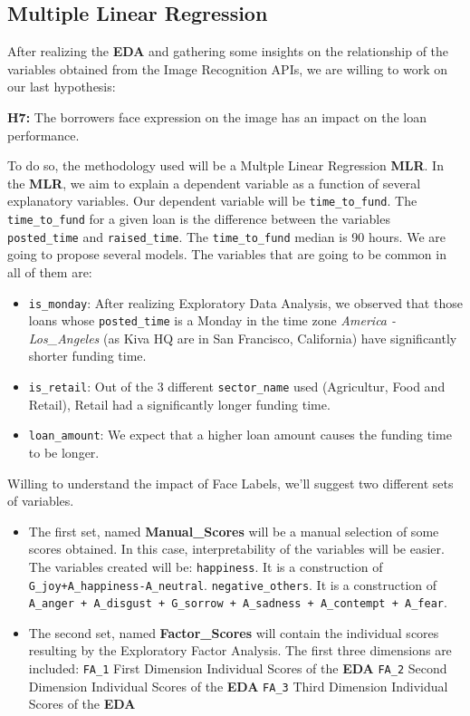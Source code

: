 

\subsection{Multiple Linear Regression}
After realizing the \textbf{EDA} and gathering some insights on the relationship of the variables obtained from the Image Recognition APIs, we are willing to work on our last hypothesis:
\begin{tcolorbox}
\textbf{H7:} The borrowers face expression on the image has an impact on the loan performance.
\end{tcolorbox}
To do so, the methodology used will be a Multple Linear Regression \textbf{MLR}.
In the \textbf{MLR}, we aim to explain a dependent variable as a function of several explanatory variables. Our dependent variable will be \texttt{time\_to\_fund}. The \texttt{time\_to\_fund} for a given loan is the difference between the variables \texttt{posted\_time} and \texttt{raised\_time}. The \texttt{time\_to\_fund} median is 90 hours.
We are going to propose several models. The variables that are going to be common in all of them are:
\begin{itemize}
\item \texttt{is\_monday}: After realizing Exploratory Data Analysis, we observed that those loans whose \texttt{posted\_time} is a Monday in the time zone \textit{America - Los\_Angeles} (as Kiva HQ are in San Francisco, California) have significantly shorter funding time.
\item \texttt{is\_retail}: Out of the 3 different \texttt{sector\_name} used (Agricultur, Food and Retail), Retail had a significantly longer funding time.
\item \texttt{loan\_amount}: We expect that a higher loan amount causes the funding time to be longer.
\end{itemize}
Willing to understand the impact of Face Labels, we'll suggest two different sets of variables.
\begin{itemize}
\item The first set, named \textbf{Manual\_Scores} will be a manual selection of some scores obtained. In this case, interpretability of the variables will be easier. The variables created will be:
\subitem \texttt{happiness}. It is a construction of \texttt{G\_joy+A\_happiness-A\_neutral}.
\subitem \texttt{negative\_others}. It is a construction of \texttt{A\_anger + A\_disgust + G\_sorrow + A\_sadness + A\_contempt + A\_fear}.
\item The second set, named \textbf{Factor\_Scores} will contain the individual scores resulting by the Exploratory Factor Analysis. The first three dimensions are included:
\subitem \texttt{FA\_1} First Dimension Individual Scores of the \textbf{EDA}
\subitem \texttt{FA\_2} Second Dimension Individual Scores of the \textbf{EDA}
\subitem \texttt{FA\_3} Third Dimension Individual Scores of the \textbf{EDA}
\end{itemize}

